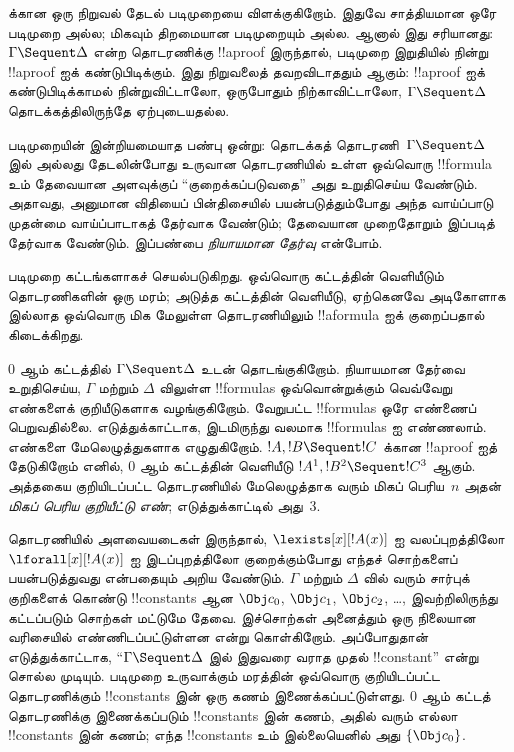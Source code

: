\documentclass[../../../include/open-logic-section]{subfiles}
\begin{document}


 க்கான ஒரு நிறுவல் தேடல் படிமுறையை
விளக்குகிறோம். இதுவே சாத்தியமான ஒரே படிமுறை அல்ல;
மிகவும் திறமையான படிமுறையும் அல்ல. ஆனால் இது சரியானது:
$\Gamma \Sequent \Delta$ என்ற தொடரணிக்கு
!!a{proof} இருந்தால், படிமுறை இறுதியில் நின்று
!!a{proof} ஐக் கண்டுபிடிக்கும். இது நிறுவலைத்
தவறவிடாததும் ஆகும்: !!a{proof} ஐக் கண்டுபிடிக்காமல்
நின்றுவிட்டாலோ, ஒருபோதும் நிற்காவிட்டாலோ,
$\Gamma \Sequent \Delta$ தொடக்கத்திலிருந்தே
ஏற்புடையதல்ல.

படிமுறையின் இன்றியமையாத பண்பு ஒன்று: தொடக்கத்
தொடரணி~$\Gamma \Sequent \Delta$ இல் அல்லது
தேடலின்போது உருவான தொடரணியில் உள்ள ஒவ்வொரு
!!{formula} உம் தேவையான அளவுக்குப் ``குறைக்கப்படுவதை''
அது உறுதிசெய்ய வேண்டும். அதாவது, அனுமான விதியைப்
பின்திசையில் பயன்படுத்தும்போது அந்த வாய்ப்பாடு
முதன்மை வாய்ப்பாடாகத் தேர்வாக வேண்டும்; தேவையான
முறைதோறும் இப்படித் தேர்வாக வேண்டும். இப்பண்பை
\emph{நியாயமான தேர்வு} என்போம்.

படிமுறை கட்டங்களாகச் செயல்படுகிறது. ஒவ்வொரு
கட்டத்தின் வெளியீடும் தொடரணிகளின் ஒரு மரம்;
அடுத்த கட்டத்தின் வெளியீடு, ஏற்கெனவே அடிகோளாக
இல்லாத ஒவ்வொரு மிக மேலுள்ள தொடரணியிலும்
!!a{formula} ஐக் குறைப்பதால் கிடைக்கிறது.

$0$ ஆம் கட்டத்தில் $\Gamma \Sequent \Delta$
உடன் தொடங்குகிறோம். நியாயமான தேர்வை உறுதிசெய்ய,
$\Gamma$ மற்றும் $\Delta$ விலுள்ள !!{formula}s
ஒவ்வொன்றுக்கும் வெவ்வேறு எண்களைக் குறியீடுகளாக
வழங்குகிறோம். வேறுபட்ட !!{formula}s ஒரே எண்ணைப்
பெறுவதில்லை. எடுத்துக்காட்டாக, இடமிருந்து வலமாக
!!{formula}s ஐ எண்ணலாம். எண்களை மேலெழுத்துகளாக
எழுதுகிறோம். $!A, !B \Sequent !C$ க்கான
!!a{proof} ஐத் தேடுகிறோம் எனில்,
$0$ ஆம் கட்டத்தின் வெளியீடு
$!A^1, !B^2 \Sequent !C^3$ ஆகும். அத்தகைய
குறியிடப்பட்ட தொடரணியில் மேலெழுத்தாக வரும்
மிகப் பெரிய~$n$ அதன் \emph{மிகப் பெரிய குறியீட்டு எண்};
எடுத்துக்காட்டில் அது~$3$.

தொடரணியில் அளவையடைகள் இருந்தால்,
$\lexists[x][!A(x)]$ ஐ வலப்புறத்திலோ
$\lforall[x][!A(x)]$ ஐ இடப்புறத்திலோ
குறைக்கும்போது எந்தச் சொற்களைப் பயன்படுத்துவது
என்பதையும் அறிய வேண்டும். $\Gamma$ மற்றும்
$\Delta$ வில் வரும் சார்புக் குறிகளைக் கொண்டு
!!{constant}s ஆன $\Obj c_0$, $\Obj c_1$,
$\Obj c_2$, \dots, இவற்றிலிருந்து கட்டப்படும்
சொற்கள் மட்டுமே தேவை. இச்சொற்கள் அனைத்தும்
ஒரு நிலையான வரிசையில் எண்ணிடப்பட்டுள்ளன என்று
கொள்கிறோம். அப்போதுதான் எடுத்துக்காட்டாக,
``$\Gamma \Sequent \Delta$ இல் இதுவரை
வராத முதல் !!{constant}'' என்று சொல்ல முடியும்.
படிமுறை உருவாக்கும் மரத்தின் ஒவ்வொரு குறியிடப்பட்ட
தொடரணிக்கும் !!{constant}s இன் ஒரு கணம்
இணைக்கப்பட்டுள்ளது. $0$ ஆம் கட்டத் தொடரணிக்கு
இணைக்கப்படும் !!{constant}s இன் கணம், அதில் வரும் எல்லா
!!{constant}s இன் கணம்; எந்த !!{constant}s உம்
இல்லையெனில் அது $\{\Obj c_0\}$.
\end{document}
